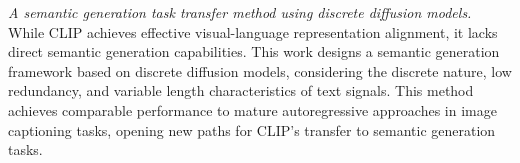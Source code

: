 \begin{abstract*}
\textit{A semantic generation task transfer method using discrete diffusion models.} While CLIP achieves effective visual-language representation alignment, it lacks direct semantic generation capabilities. This work designs a semantic generation framework based on discrete diffusion models, considering the discrete nature, low redundancy, and variable length characteristics of text signals. This method achieves comparable performance to mature autoregressive approaches in image captioning tasks, opening new paths for CLIP's transfer to semantic generation tasks.
\end{abstract*}
